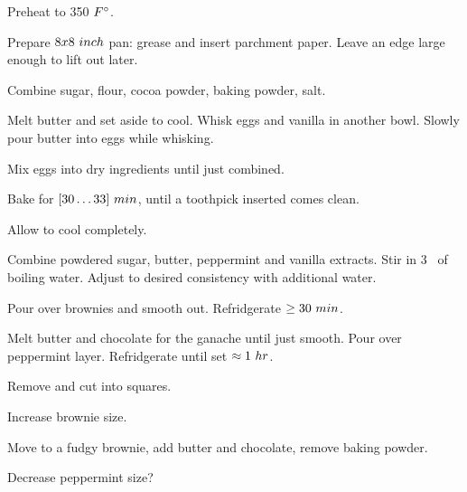 \begin{preparation}
\item Preheat to 350 $\Fahrenheit$.

\item Prepare $8x8~\inch$ pan: grease and insert parchment paper.
	Leave an edge large enough to lift out later.

\item Combine sugar, flour, cocoa powder, baking powder, salt.

\item Melt butter and set aside to cool.
	Whisk eggs and vanilla in another bowl.
	Slowly pour butter into eggs while whisking.

\item Mix eggs into dry ingredients until just combined.

\item Bake for $[30 \ldots 33]~\minute$, until a toothpick inserted comes clean.

\item Allow to cool completely.

\item Combine powdered sugar, butter, peppermint and vanilla extracts.
	Stir in 3 \Tablespoon~of boiling water.
	Adjust to desired consistency with additional water.

\item Pour over brownies and smooth out.
	Refridgerate $\ge 30~\minute$.

\item Melt butter and chocolate for the ganache until just smooth.
	Pour over peppermint layer.
	Refridgerate until set $\approx 1~\hour$.

\item Remove and cut into squares.
\end{preparation}


\begin{experiments}
\item Increase brownie size.
\item Move to a fudgy brownie, add butter and chocolate, remove baking powder.
\item Decrease peppermint size?
\end{experiments}


\recipeend
